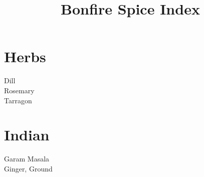 \documentclass[twocolumn]{article}
\title{Bonfire Spice Index}
\begin{document}
\maketitle

\section*{Herbs}

Dill\\
Rosemary\\
Tarragon\\

\section*{Indian}

Garam Masala\\
Ginger, Ground\\
\end{document}
